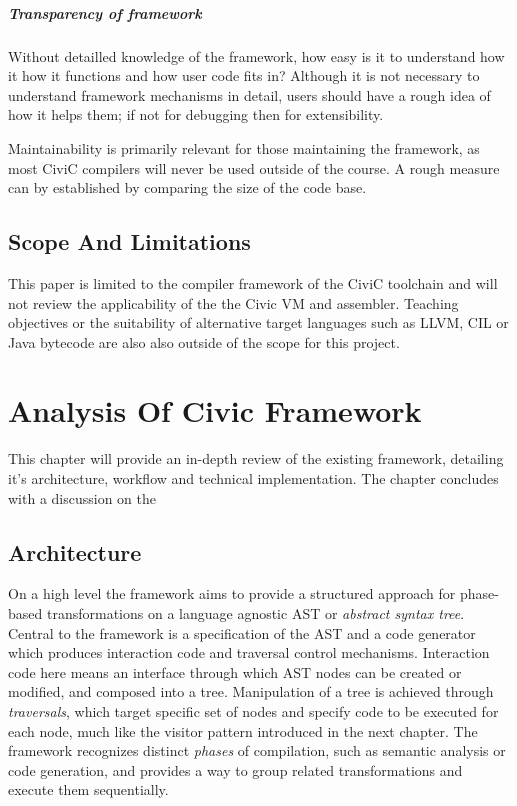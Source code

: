 \documentclass[twoside,openright]{uva-bachelor-thesis}
\begin{document}
		\paragraph{Transparency of framework}
			Without detailled knowledge of the framework, how easy is it to understand how it how it functions and how user code fits in? Although it is not necessary to understand framework mechanisms in detail, users should have a rough idea of how it helps them; if not for debugging then for extensibility.
			
		Maintainability is primarily relevant for those maintaining the framework, as most CiviC compilers will never be used outside of the  course. A rough measure can by established by comparing the size of the code base.
		
	
	\section{Scope And Limitations}
		This paper is limited to the compiler framework of the CiviC toolchain and will not review the applicability of the the Civic VM and assembler. Teaching objectives or the suitability of alternative target languages such as LLVM, CIL or Java bytecode are also also outside of the scope for this project.
			


\chapter{Analysis Of Civic Framework}
\label{analysis}
	This chapter will provide an in-depth review of the existing framework, detailing it's architecture, workflow and technical implementation. The chapter concludes with a discussion on the 
				
	\section{Architecture}
		On a high level the framework aims to provide a structured approach for phase-based transformations on a language agnostic AST or \emph{abstract syntax tree}. Central to the framework is a specification of the AST and a code generator which produces interaction code and traversal control mechanisms. Interaction code here means an interface through which AST nodes can be created or modified, and composed into a tree. Manipulation of a tree is achieved through \emph{traversals}, which target specific set of nodes and specify code to be executed for each node, much like the visitor pattern introduced in the next chapter. The framework recognizes distinct \emph{phases} of compilation, such as semantic analysis or code generation, and provides a way to group related transformations and execute them sequentially.
				
\end{document}
